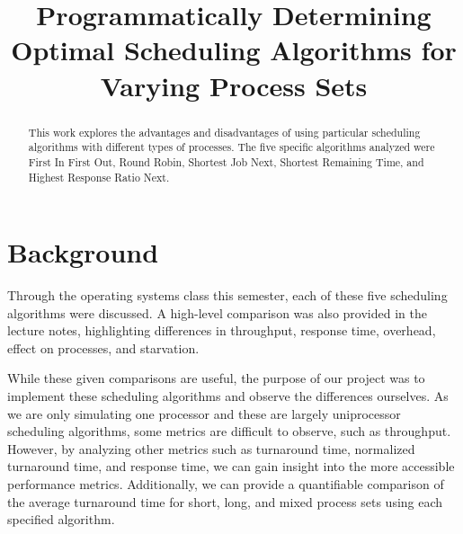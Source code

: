 \documentclass[conference,11pt]{IEEEtran}
\begin{document}
%
\title{Programmatically Determining Optimal Scheduling Algorithms for Varying Process Sets}

\author{
}

\maketitle

\begin{abstract}
This work explores the advantages and disadvantages of using particular scheduling algorithms with different types of processes. The five specific algorithms analyzed were First In First Out, Round Robin, Shortest Job Next, Shortest Remaining Time, and Highest Response Ratio Next.
\end{abstract}

\section{Background}
Through the operating systems class this semester, each of these five scheduling algorithms were discussed. A high-level comparison was also provided in the lecture notes, highlighting differences in throughput, response time, overhead, effect on processes, and starvation.

While these given comparisons are useful, the purpose of our project was to implement these scheduling algorithms and observe the differences ourselves. As we are only simulating one processor and these are largely uniprocessor scheduling algorithms, some metrics are difficult to observe, such as throughput. However, by analyzing other metrics such as turnaround time, normalized turnaround time, and response time, we can gain insight into the more accessible performance metrics. Additionally, we can provide a quantifiable comparison of the average turnaround time for short, long, and mixed process sets using each specified algorithm.
\end{document}
